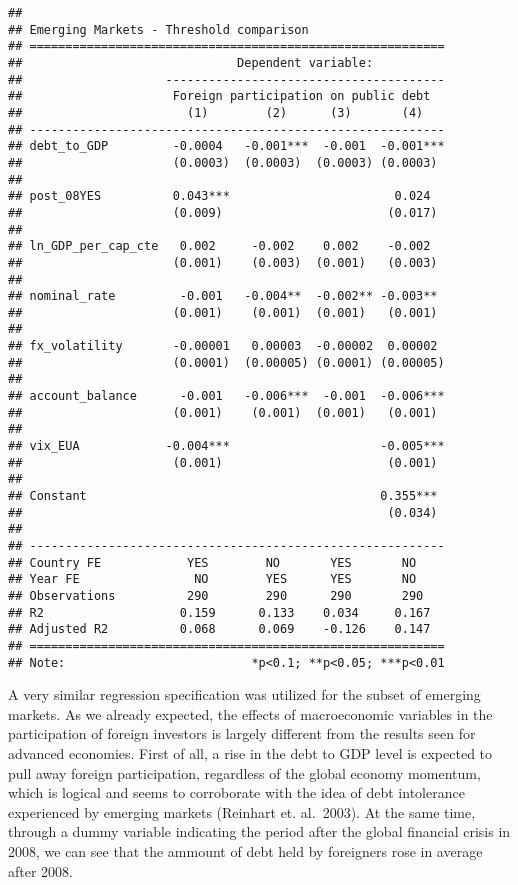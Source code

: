 \documentclass[
]{article}
\begin{document}
\begin{verbatim}
## 
## Emerging Markets - Threshold comparison
## ==========================================================
##                              Dependent variable:          
##                    ---------------------------------------
##                     Foreign participation on public debt  
##                       (1)        (2)      (3)       (4)   
## ----------------------------------------------------------
## debt_to_GDP         -0.0004   -0.001***  -0.001  -0.001***
##                     (0.0003)  (0.0003)  (0.0003) (0.0003) 
##                                                           
## post_08YES          0.043***                       0.024  
##                     (0.009)                       (0.017) 
##                                                           
## ln_GDP_per_cap_cte   0.002     -0.002    0.002    -0.002  
##                     (0.001)    (0.003)  (0.001)   (0.003) 
##                                                           
## nominal_rate         -0.001   -0.004**  -0.002** -0.003** 
##                     (0.001)    (0.001)  (0.001)   (0.001) 
##                                                           
## fx_volatility       -0.00001   0.00003  -0.00002  0.00002 
##                     (0.0001)  (0.00005) (0.0001) (0.00005)
##                                                           
## account_balance      -0.001   -0.006***  -0.001  -0.006***
##                     (0.001)    (0.001)  (0.001)   (0.001) 
##                                                           
## vix_EUA            -0.004***                     -0.005***
##                     (0.001)                       (0.001) 
##                                                           
## Constant                                         0.355*** 
##                                                   (0.034) 
##                                                           
## ----------------------------------------------------------
## Country FE            YES        NO       YES       NO    
## Year FE                NO        YES      YES       NO    
## Observations          290        290      290       290   
## R2                   0.159      0.133    0.034     0.167  
## Adjusted R2          0.068      0.069    -0.126    0.147  
## ==========================================================
## Note:                          *p<0.1; **p<0.05; ***p<0.01
\end{verbatim}

A very similar regression specification was utilized for the subset of
emerging markets. As we already expected, the effects of macroeconomic
variables in the participation of foreign investors is largely different
from the results seen for advanced economies. First of all, a rise in
the debt to GDP level is expected to pull away foreign participation,
regardless of the global economy momentum, which is logical and seems to
corroborate with the idea of debt intolerance experienced by emerging
markets (Reinhart et. al.~2003). At the same time, through a dummy
variable indicating the period after the global financial crisis in
2008, we can see that the ammount of debt held by foreigners rose in
average after 2008.
\end{document}
